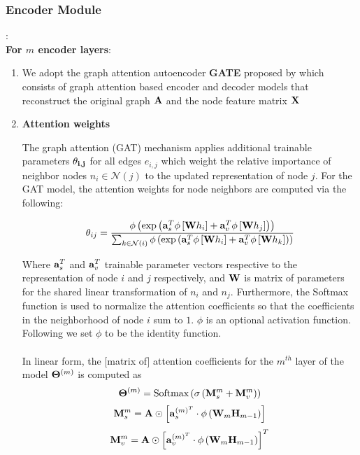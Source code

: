 \documentclass[a4paper,12pt]{article}
\newcommand{\forceindent}{\leavevmode{\parindent=2em\indent}}
\begin{document}
	 \subsubsection{Encoder Module}: \\
		 \forceindent \textbf{For $m$ encoder layers}: 
			\begin{enumerate}
				\item[]{We adopt the graph attention autoencoder \textbf{GATE} proposed by \cite{salehi2019graph} which consists of graph attention based encoder and decoder models that reconstruct the original graph ${\bf A}$ and the node feature matrix $\bf{X}$}
				\item[]{\textbf{Attention weights} 
					
					The graph attention (GAT) mechanism applies additional trainable parameters ${\bf \theta_{i,j}}$ for all edges ${e_{i,j}}$ which weight the relative importance of neighbor nodes $n_i \in \mathcal{N}(j)$ to the updated representation of node $j$. For the GAT model, the attention weights for node neighbors are computed via the following:
					
					\[ \theta_{ij} = \frac{\phi\left(\exp\left({\bf a}_s^T\phi\left[{\bf W}h_i\right]+{\bf a}_v^T\phi\left[{\bf W}h_j \right]\right)\right)}
					{\sum_{k\in \mathcal{N}(i)}\phi\left(\exp\left({\bf a}_s^T\phi\left[{\bf W}h_i\right]+{\bf a}_v^T\phi\left[{\bf W}h_k \right]\right)\right)} \]
					
					Where ${\bf a}_s^T$ and ${\bf a}_v^T$ trainable parameter vectors respective to the representation of node $i$ and $j$ respectively, and $\bf W$ is matrix of parameters for the shared linear transformation of $n_i$ and $n_j$. Furthermore, the Softmax function is used to normalize the attention coefficients so that the coefficients in the neighborhood of node $i$ sum to $1$. $\phi$ is an optional activation function. Following \cite{salehi2019graph} we set $\phi$ to be the identity function.  \\
					\\
					In linear form, the [matrix of] attention coefficients for the $m^{th}$ layer of the model ${\bf \Theta}^{(m)}$ is computed as 
					\[{\bf \Theta}^{(m)} = \text{Softmax}\left(\sigma\left({\bf M}_s^{m} + {\bf M}_v^{m}\right)\right) \]
					\[{\bf M}_s^{m} = {\bf A}\odot \left[{\bf a}_s^{(m)^T} \cdot \phi\left({\bf W}_{m}{\bf H}_{m-1}\right)\right]\]
					\[{\bf M}_v^{m} = {\bf A}\odot \left[{\bf a}_v^{(m)^T}\cdot \phi\left( {\bf W}_{m}{\bf H}_{m-1}\right)\right]^T\]
					
}
\end{enumerate}
\end{document}
